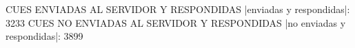 CUES ENVIADAS AL SERVIDOR Y RESPONDIDAS
|enviadas y respondidas|: 3233
CUES NO ENVIADAS AL SERVIDOR Y RESPONDIDAS
|no enviadas y respondidas|: 3899